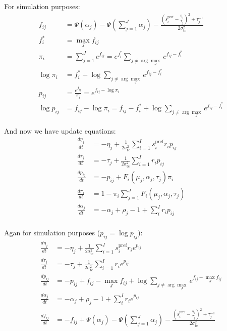 \documentclass[12pt]{article}
\begin{document}
For simulation purposes:
\begin{equation}
\begin{aligned}
f_{ij} &= \Psi(\alpha_j) - \Psi(\sum_{j=1}^J \alpha_j) - \frac{(s_i^{\text{pref}} - \frac{\eta_j}{\tau_j})^2 + \tau_j^{-1}}{2 \sigma_{\text{tc}}^2}\\
f_i^* &= \max_J f_{ij}\\
\pi_i &= \sum_{j=1}^J e^{f_{ij}} = e^{f_i^*} \sum_{j \neq \arg \max_J} e^{f_{ij} - f_i^*}\\
\log \pi_i &= f_i^* + \log \sum_{j \neq \arg \max_J} e^{f_{ij} - f_i^*}\\
p_{ij} &= \frac{e^{f_{ij}}}{\pi_i} = e^{f_{ij} - \log \pi_i}\\
\log p_{ij} &= f_{ij} - \log \pi_i = f_{ij} - f_i^* + \log \sum_{j \neq \arg \max_J} e^{f_{ij} - f_i^*}
\end{aligned}
\end{equation}

And now we have update equations: 
\begin{equation}
\begin{aligned}
\frac{d \eta_j}{dt} &= - \eta_j + \frac{1}{2 \sigma_{\text{tc}}^2} \sum_{i=1}^I s_i^{\text{pref}} r_i p_{ij}\\
\frac{d \tau_j}{dt} &= - \tau_j + \frac{1}{2 \sigma_{\text{tc}}^2} \sum_{i=1}^I r_i p_{ij}\\
\frac{d p_{ij}}{dt} &= - p_{ij} + F_i(\mu_j, \alpha_j, \tau_j) \pi_i\\
\frac{d \pi_i}{dt} &= 1 - \pi_i \sum_{j=1}^J F_i(\mu_j, \alpha_j, \tau_j)\\
\frac{d \alpha_j}{dt} &= - \alpha_j + \rho_j - 1 + \sum_i^I r_i p_{ij}\\
\end{aligned}
\end{equation}

Agan for simulation purposes ($p_{ij} = \log p_{ij}$):
\begin{equation}
\begin{aligned}
\frac{d \eta_j}{dt} &= - \eta_j + \frac{1}{2 \sigma_{\text{tc}}^2} \sum_{i=1}^I s_i^{\text{pref}} r_i e^{p_{ij}}\\
\frac{d \tau_j}{dt} &= - \tau_j + \frac{1}{2 \sigma_{\text{tc}}^2} \sum_{i=1}^I r_i e^{p_{ij}}\\
\frac{d p_{ij}}{dt} &= - p_{ij} + f_{ij} - \max_J f_{ij} + \log \sum_{j \neq \arg \max_J} e^{f_{ij} - \max_J f_{ij}}\\
\frac{d \alpha_j}{dt} &= - \alpha_j + \rho_j - 1 + \sum_i^I r_i e^{p_{ij}}\\
\frac{d f_{ij}}{dt} &= - f_{ij} + \Psi(\alpha_j) - \Psi(\sum_{j=1}^J \alpha_j) - \frac{(s_i^{\text{pref}} - \frac{\eta_j}{\tau_j})^2 + \tau_j^{-1}}{2 \sigma_{\text{tc}}^2}\\
\end{aligned}
\end{equation}

\iffalse
(Assume normalization is $\tau$ then we want to normalize all p terms by $\frac{1}{\tau}$. $\tau^{-1} = \prod C^{N_{ij}} = C^{\sum_j N_{ij}} = $ constant)
\fi
\end{document}
